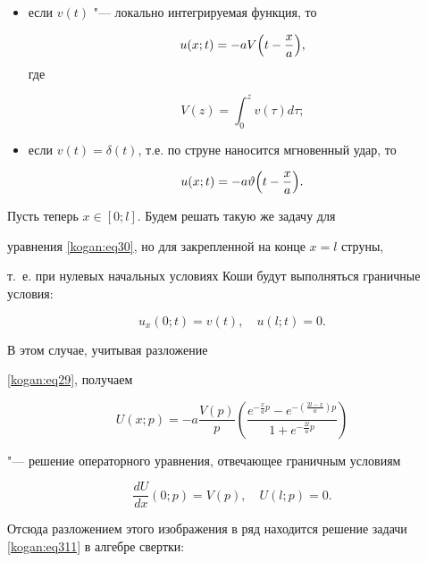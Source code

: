 \begin{itemize}

\item[а)] если  $v(t)$ "--- локально интегрируемая функция, то 

$$u(x;t)=-aV\Bigl( t-\frac{x}{a} \Bigr),$$ где 

$$V(z)=\int_0^z v(\tau )d\tau;$$ 



\item[б)] если  $v(t)=\delta (t)$, т.е. по струне наносится мгновенный удар, то

$$

u(x;t)=-a\vartheta \Bigl(t-\frac{x}{a}\Bigr).

$$





	

\end{itemize}



Пусть теперь $x\in [0;l]$. Будем решать такую же задачу для 

уравнения \eqref{kogan:eq30}, но для закрепленной на конце $x=l$ струны, 

т.~е. при нулевых начальных условиях Коши будут выполняться граничные условия:

\begin{equation}

\label{kogan:eq311}

u_x (0;t)=v(t),

\quad

u(l;t)=0.

\end{equation}



В этом случае, учитывая разложение 

\eqref{kogan:eq29}, получаем

$$

U(x;p)=-a\frac{V(p)}{p}\left(  \frac{e^{-\frac{x}{a}p}-e^{-(\frac{2l-x}{a})p}}{1+e^{-\frac{2l}{a}p}} \right)

$$

"--- решение операторного уравнения,  отвечающее граничным условиям

$$\frac{dU}{dx}(0;p)=V(p), \quad  U(l;p)=0.$$



Отсюда разложением этого изображения в ряд находится решение задачи \eqref{kogan:eq311} в алгебре свертки:

